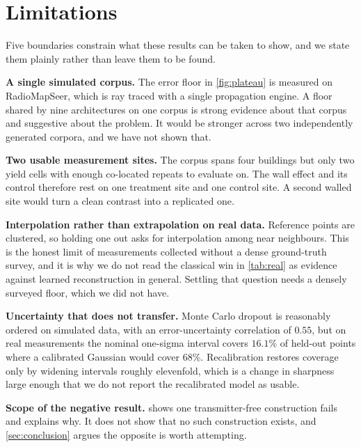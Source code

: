 \section{Limitations}
\label{sec:limitations}

Five boundaries constrain what these results can be taken to show, and we state
them plainly rather than leave them to be found.

\noindent\textbf{A single simulated corpus.} The error floor in \cref{fig:plateau} is
measured on RadioMapSeer, which is ray traced with a single propagation engine. A
floor shared by nine architectures on one corpus is strong evidence about that
corpus and suggestive about the problem. It would be stronger across two
independently generated corpora, and we have not shown that.

\noindent\textbf{Two usable measurement sites.} The corpus spans four buildings but
only two yield cells with enough co-located repeats to evaluate on. The wall effect
and its control therefore rest on one treatment site and one control site. A second
walled site would turn a clean contrast into a replicated one.

\noindent\textbf{Interpolation rather than extrapolation on real data.} Reference points
are clustered, so holding one out asks for interpolation among near neighbours.
This is the honest limit of measurements collected without a dense ground-truth
survey, and it is why we do not read the classical win in \cref{tab:real} as
evidence against learned reconstruction in general. Settling that question needs a
densely surveyed floor, which we did not have.

\noindent\textbf{Uncertainty that does not transfer.} Monte Carlo dropout is reasonably
ordered on simulated data, with an error-uncertainty correlation of $0.55$, but on
real measurements the nominal one-sigma interval covers $16.1\%$ of held-out points
where a calibrated Gaussian would cover $68\%$. Recalibration restores coverage
only by widening intervals roughly elevenfold, which is a change in sharpness large
enough that we do not report the recalibrated model as usable.

\noindent\textbf{Scope of the negative result.}
 shows one transmitter-free construction fails and explains
why. It does not show that no such construction exists, and \cref{sec:conclusion}
argues the opposite is worth attempting.

